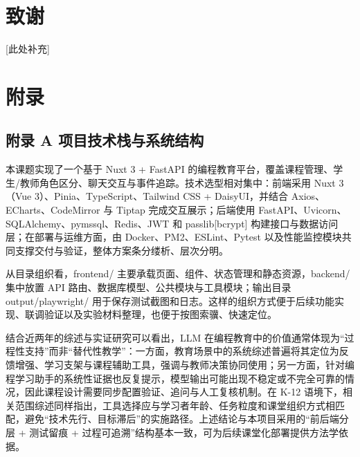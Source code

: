 \clearpage
{}
{}\label{ux53c2ux8003ux6587ux732e}
\nocite{*}



\chapter*{致谢}\label{ux81f4ux8c22}

{[}此处补充{]}

\chapter*{附录}\label{ux9644ux5f55}

\section*{附录 A 项目技术栈与系统结构}\label{ux9644ux5f55-a-ux9879ux76eeux6280ux672fux6808ux4e0eux7cfbux7edfux7ed3ux6784}

本课题实现了一个基于 Nuxt 3 + FastAPI 的编程教育平台，覆盖课程管理、学生/教师角色区分、聊天交互与事件追踪。技术选型相对集中：前端采用 Nuxt 3（Vue 3）、Pinia、TypeScript、Tailwind CSS + DaisyUI，并结合 Axios、ECharts、CodeMirror 与 Tiptap 完成交互展示；后端使用 FastAPI、Uvicorn、SQLAlchemy、pymssql、Redis、JWT 和 passlib[bcrypt] 构建接口与数据访问层；在部署与运维方面，由 Docker、PM2、ESLint、Pytest 以及性能监控模块共同支撑交付与验证，整体方案条分缕析、层次分明。

从目录组织看，frontend/ 主要承载页面、组件、状态管理和静态资源，backend/ 集中放置 API 路由、数据库模型、公共模块与工具模块；输出目录 output/playwright/ 用于保存测试截图和日志。这样的组织方式便于后续功能实现、联调验证以及实验材料整理，也便于按图索骥、快速定位。

结合近两年的综述与实证研究可以看出，LLM 在编程教育中的价值通常体现为“过程性支持”而非“替代性教学”：一方面，教育场景中的系统综述普遍将其定位为反馈增强、学习支架与课程辅助工具，强调与教师决策协同使用\cite{wang2024llmedu,raihan2025cseduslr,pitts2025llmprogedu}；另一方面，针对编程学习助手的系统性证据也反复提示，模型输出可能出现不稳定或不完全可靠的情况，因此课程设计需要同步配置验证、追问与人工复核机制\cite{pirzado2024pitfalls,jeon2023complementary}。在 K-12 语境下，相关范围综述同样指出，工具选择应与学习者年龄、任务粒度和课堂组织方式相匹配，避免“技术先行、目标滞后”的实施路径\cite{yim2024k12scoping}。上述结论与本项目采用的“前后端分层 + 测试留痕 + 过程可追溯”结构基本一致，可为后续课堂化部署提供方法学依据。

